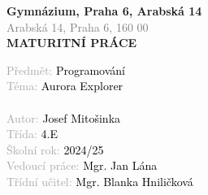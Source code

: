 \thispagestyle{empty}
\begin{titlepage}
    \begin{center}
        \vspace*{1cm}

        {\Large \textbf{Gymnázium, Praha 6, Arabská 14}} \\
        \vspace{0.5cm} 
        \textcolor{gray}{\large Arabská 14, Praha 6, 160 00}\\
        \vspace{5cm} 
        {\Large \textbf{MATURITNÍ PRÁCE}}\\
        \vspace{5cm}
    \end{center}
    \textcolor{darkgray}{\large
    Předmět:\hspace{0.2cm} \textcolor{black}{Programování}\\
    Téma:\hspace{0.2cm} \textcolor{black}{Aurora Explorer}\\
    \vspace{0.8cm} \\
    Autor:\hspace{0.2cm} \textcolor{black}{Josef Mitošinka} \\
    Třída:\hspace{0.2cm} \textcolor{black}{4.E} \\
    Školní rok:\hspace{0.2cm} \textcolor{black}{2024/25} \\
    Vedoucí práce:\hspace{0.2cm} \textcolor{black}{Mgr. Jan Lána} \\
    Třídní učitel:\hspace{0.2cm} \textcolor{black}{Mgr. Blanka Hniličková} \\
    }
    
    
\end{titlepage}